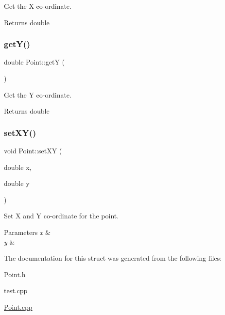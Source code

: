 Get the X co-\/ordinate. 

\begin{DoxyReturn}{Returns}
double 
\end{DoxyReturn}
\mbox{\label{classPoint_aa278c8bcb8aeb4101023a4baf473b547}} 
\subsubsection{\texorpdfstring{get\+Y()}{getY()}}
{\footnotesize\ttfamily double Point\+::getY (\begin{DoxyParamCaption}{ }\end{DoxyParamCaption})}



Get the Y co-\/ordinate. 

\begin{DoxyReturn}{Returns}
double 
\end{DoxyReturn}
\mbox{\label{classPoint_ad62d5a34b47be46beab076e61628e470}} 
\subsubsection{\texorpdfstring{set\+X\+Y()}{setXY()}}
{\footnotesize\ttfamily void Point\+::set\+XY (\begin{DoxyParamCaption}\item[{double}]{x,  }\item[{double}]{y }\end{DoxyParamCaption})}



Set X and Y co-\/ordinate for the point. 


\begin{DoxyParams}{Parameters}
{\em x} & \\
\hline
{\em y} & \\
\hline
\end{DoxyParams}


The documentation for this struct was generated from the following files\+:\begin{DoxyCompactItemize}
\item 
Point.\+h\item 
test.\+cpp\item 
\hyperlink{Point_8cpp}{Point.\+cpp}\end{DoxyCompactItemize}
